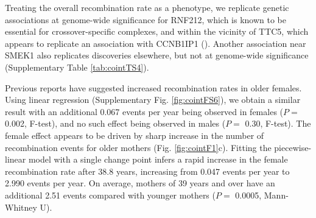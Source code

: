 
Treating the overall recombination rate as a phenotype, we
replicate genetic associations at genome-wide significance for
RNF212, which is known to be essential for crossover-specific
complexes\cite{Reynolds2013}, and within the vicinity of TTC5, which appears
to replicate an association with CCNB1IP1 (\citet{Kong2014}). Another
association near SMEK1 also replicates discoveries elsewhere\cite{Kong2014},
but not at genome-wide significance (Supplementary Table \ref{tab:cointTS4}).

Previous reports have suggested increased recombination rates
in older females\cite{Kong2004,Coop2008}. Using linear regression (Supplementary
Fig. \ref{fig:cointFS6}), we obtain a similar result with an additional 0.067
events per year being observed in females ($P=$ 0.002, F-test), and
no such effect being observed in males ($P=$ 0.30, F-test). The
female effect appears to be driven by sharp increase in the
number of recombination events for older mothers (Fig. \ref{fig:cointF1}c).
Fitting the piecewise-linear model with a single change point
infers a rapid increase in the female recombination rate after 38.8
years, increasing from 0.047 events per year to 2.990 events per
year. On average, mothers of 39 years and over have an additional
2.51 events compared with younger mothers ($P=$ 0.0005,
Mann-Whitney U).

